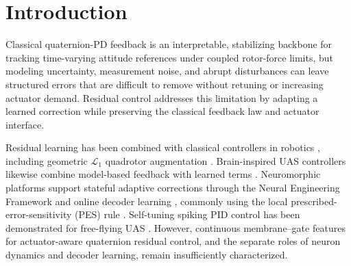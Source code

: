 \documentclass[letterpaper, 10 pt, conference]{ieeeconf}
\begin{document}
\begin{abstract}
Quadrotor attitude controllers must track time-varying references while respecting coupled rotor-force limits under modeling uncertainty, measurement noise, and disturbances.
We present an online neuromorphic residual: six continuous membrane--gate units generate temporal features and eighteen decoder weights adapt through prescribed error sensitivity (PES). The bounded correction is added to a saturated PD quaternion controller before rotor-force allocation, preserving the classical feedback path; a bounded-residual-interface property guarantees a known per-axis command-deviation bound and exact baseline recovery at zero authority.
Against tuned PD-feedforward baselines at $\rho=3$, the residual retains geometric-mean error reductions of $6.5$--$35.6\%$, degrading only on Hardstep. The results indicate that persistent activity with online decoder learning is the principal mechanism.
\end{abstract}

\section{Introduction}


Classical quaternion-PD feedback is an interpretable, stabilizing backbone for
tracking time-varying attitude references under coupled rotor-force limits,
but modeling uncertainty, measurement noise, and abrupt disturbances can leave
structured errors that are difficult to remove without retuning or increasing
actuator demand. Residual control addresses this limitation by adapting a
learned correction while preserving the classical feedback law and actuator
interface.


Residual learning has been combined with classical controllers in robotics
\cite{johannink2019}, including geometric $\mathcal L_1$ quadrotor
augmentation \cite{wu2025l1quad}. Brain-inspired UAS controllers likewise
combine model-based feedback with learned terms
\cite{rubioscola2023limbic,rubioscola2021mambo}. Neuromorphic platforms support
stateful adaptive corrections through the Neural Engineering Framework and
online decoder learning \cite{eliasmith2004neuraleng,bekolay2014nengo}, commonly
using the local prescribed-error-sensitivity (PES) rule \cite{voelker2015pes}.
Self-tuning spiking PID control has been demonstrated for free-flying UAS
\cite{olivares2026selftuning}. However, continuous
membrane--gate features for actuator-aware quaternion residual control, and the
separate roles of neuron dynamics and decoder learning, remain insufficiently
characterized.
\end{document}
